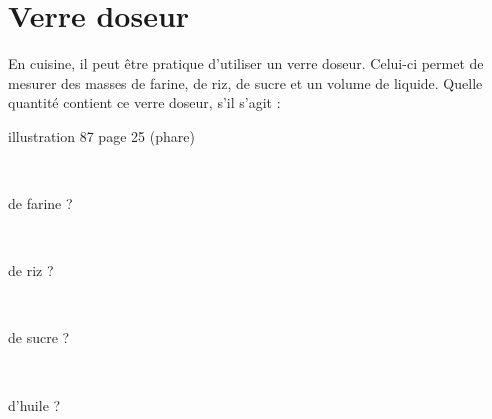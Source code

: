 \section{Verre doseur}


En cuisine, il peut être pratique d'utiliser un verre doseur. Celui-ci permet de mesurer des masses de farine, de riz, de sucre et un volume de liquide.
Quelle quantité contient ce verre doseur, s'il s'agit :

illustration 87 page 25 (phare)
\begin{questions}
	
	\begin{multicols}{2}
		
	\question[] \ 
	
	de farine ? 
	
	
	\question[] \ 
	
	de riz ?
	
	
	\question[] \ 
	
	de sucre ? 
	
	
	\question[] \ 
	
	d'huile ?
	\end{multicols}
	
\end{questions}